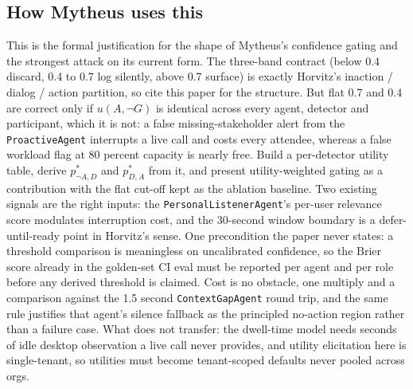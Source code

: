 \subsection{How Mytheus uses this}
\begin{takeaway}
This is the formal justification for the shape of Mytheus's confidence gating and the strongest attack on its current form. The three-band contract (below 0.4 discard, 0.4 to 0.7 log silently, above 0.7 surface) is exactly Horvitz's inaction / dialog / action partition, so cite this paper for the structure. But flat 0.7 and 0.4 are correct only if $u(A,\neg G)$ is identical across every agent, detector and participant, which it is not: a false missing-stakeholder alert from the \texttt{ProactiveAgent} interrupts a live call and costs every attendee, whereas a false workload flag at 80 percent capacity is nearly free. Build a per-detector utility table, derive $p^{*}_{\neg A,D}$ and $p^{*}_{D,A}$ from it, and present utility-weighted gating as a contribution with the flat cut-off kept as the ablation baseline. Two existing signals are the right inputs: the \texttt{PersonalListenerAgent}'s per-user relevance score modulates interruption cost, and the 30-second window boundary is a defer-until-ready point in Horvitz's sense. One precondition the paper never states: a threshold comparison is meaningless on uncalibrated confidence, so the Brier score already in the golden-set CI eval must be reported per agent and per role before any derived threshold is claimed. Cost is no obstacle, one multiply and a comparison against the 1.5 second \texttt{ContextGapAgent} round trip, and the same rule justifies that agent's silence fallback as the principled no-action region rather than a failure case. What does not transfer: the dwell-time model needs seconds of idle desktop observation a live call never provides, and utility elicitation here is single-tenant, so utilities must become tenant-scoped defaults never pooled across orgs.
\end{takeaway}

